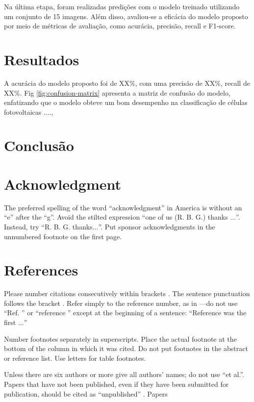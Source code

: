 \documentclass[conference]{IEEEtran}
\begin{document}
Na última etapa, foram realizadas predições com o modelo treinado utilizando
um conjunto de 15 imagens. Além disso, avaliou-se a eficácia do modelo proposto
por meio de métricas de avaliação, como acurácia, precisão, recall e F1-score.

\section{Resultados}

A acurácia do modelo proposto foi de XX\%, com uma precisão de XX\%, recall de
XX\%. Fig \ref{fig:confusion-matrix} apresenta a matriz de confusão do modelo,
enfatizando que
o modelo obteve um bom desempenho na classificação de células fotovoltaicas
....,

\section{Conclusão}

\section*{Acknowledgment}

The preferred spelling of the word ``acknowledgment'' in America is without
an ``e'' after the ``g''. Avoid the stilted expression ``one of us (R. B.
G.) thanks $\ldots$''. Instead, try ``R. B. G. thanks$\ldots$''. Put sponsor
acknowledgments in the unnumbered footnote on the first page.

\section*{References}

Please number citations consecutively within brackets \cite{b1}. The
sentence punctuation follows the bracket \cite{b2}. Refer simply to the
reference
number, as in \cite{b3}---do not use ``Ref. \cite{b3}'' or ``reference
\cite{b3}'' except at
the beginning of a sentence: ``Reference \cite{b3} was the first $\ldots$''

Number footnotes separately in superscripts. Place the actual footnote at
the bottom of the column in which it was cited. Do not put footnotes in the
abstract or reference list. Use letters for table footnotes.

Unless there are six authors or more give all authors' names; do not use
``et al.''. Papers that have not been published, even if they have been
submitted for publication, should be cited as ``unpublished'' \cite{b4}. Papers
\end{document}
